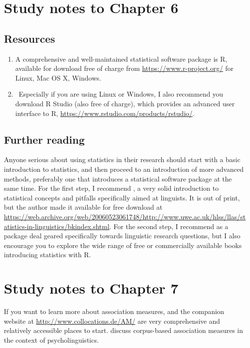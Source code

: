 \section*{Study notes to Chapter 6}
\label{sec:studynotes06}

\subsection*{Resources}

\begin{enumerate}
  \item A comprehensive and well-maintained statistical software package is R, available for download free of charge from \url{https://www.r-project.org/} for Linux, Mac OS X, Windows.
  \item Especially if you are using Linux or Windows, I also recommend you download R Studio (also free of charge), which provides an advanced user interface to R, \url{https://www.rstudio.com/products/rstudio/}.
\end{enumerate}


\subsection*{Further reading}

Anyone serious about using statistics in their research should start with a basic introduction to statistics, and then proceed to an introduction of more advanced methods, preferably one that introduces a statistical software package at the same time. For the first step, I recommend \citet{butler_statistics_1985}, a very solid introduction to statistical concepts and pitfalls specifically aimed at linguists. It is out of print, but the author made it available for free download at \url{https://web.archive.org/web/20060523061748/http://www.uwe.ac.uk/hlss/llas/statistics-in-linguistics/bkindex.shtml}. For the second step, I recommend \citet{gries_statistics_2013} as a package deal geared specifically towards linguistic research questions, but I also encourage you to explore the wide range of free or commercially available books introducing statistics with R.


\section*{Study notes to Chapter 7}
\label{sec:studynotes07}

If you want to learn more about association measures, \citet{evert_statistics_2005} and the companion website at \url{http://www.collocations.de/AM/} are very comprehensive and relatively accessible places to start. \citet{stefanowitsch_corpus-based_2016} discuss corpus-based association measures in the context of psycholinguistics.

